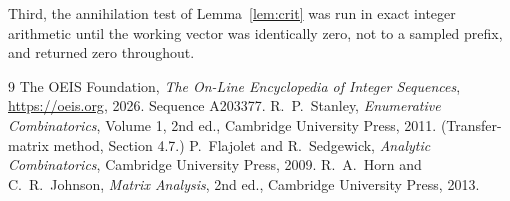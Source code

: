 \documentclass[11pt,a4paper]{article}
\theoremstyle{plain}
\theoremstyle{definition}
\begin{document}
Third, the annihilation test of Lemma~\ref{lem:crit} was run in exact integer arithmetic
until the working vector was identically zero, not to a sampled prefix, and returned zero
throughout.

\begin{thebibliography}{9}
 The OEIS Foundation, \emph{The On-Line Encyclopedia of Integer
Sequences}, \url{https://oeis.org}, 2026. Sequence A203377.
 R.~P.~Stanley, \emph{Enumerative Combinatorics}, Volume 1, 2nd ed.,
Cambridge University Press, 2011. (Transfer-matrix method, Section 4.7.)
 P.~Flajolet and R.~Sedgewick, \emph{Analytic Combinatorics}, Cambridge
University Press, 2009.
 R.~A.~Horn and C.~R.~Johnson, \emph{Matrix Analysis}, 2nd ed., Cambridge
University Press, 2013.
\end{thebibliography}
\end{document}
